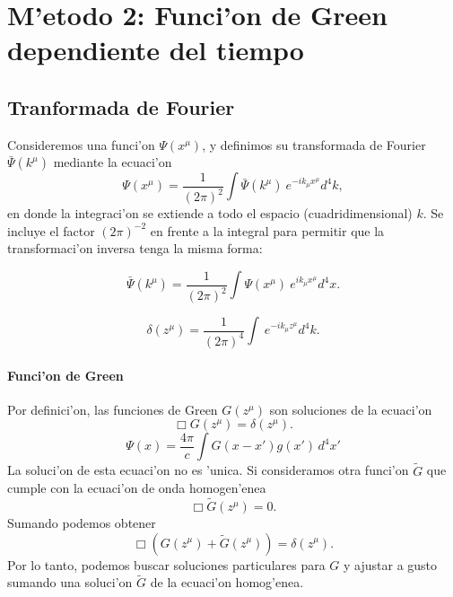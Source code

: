 \chapter{M'etodo 2: Funci'on de Green dependiente del tiempo}
\section{Tranformada de Fourier}

 Consideremos una funci'on $\Psi(x^\mu)  $,
 y definimos su transformada de Fourier $\bar{\Psi}(k^\mu)$ mediante
 la ecuaci'on%
 \begin{equation}
 \Psi(x^\mu)  =\frac{1}{(2\pi)^2}\int \bar\Psi(k^\mu)
 ~e^{-ik_\mu x^\mu }d^4k,
 \end{equation}
 en donde la integraci'on se extiende a todo el espacio
 (cuadridimensional) $k$. Se incluye el factor $(2\pi)
 ^{-2}$ en frente a la integral
 para permitir que la transformaci'on inversa tenga la misma forma:%

 \begin{equation}
 \bar{\Psi}(k^\mu)  =\frac{1}{(2\pi)^2}\int \Psi(x^\mu)
 ~e^{ik_\mu x^\mu }d^4x.
 \end{equation}

 \begin{equation}
 \delta(z^\mu) =\frac{1}{(2\pi)^4}\int~e^{-ik_\mu z^\mu }d^4k.
 \end{equation}

 \subsubsection{Funci'on de Green}

 Por definici'on, las funciones de Green $G(z^\mu)$ son soluciones de la ecuaci'on
 \begin{equation}
 \Box G(z^\mu)  =\delta(z^\mu)  .
 \end{equation}
 \begin{equation}
 \Psi (x)=\frac{4\pi}{c}\int G\left(x-x'\right) g(x')\,d^4x'
 \end{equation}
 La soluci'on de esta ecuaci'on no es 'unica. Si consideramos otra
 funci'on $\tilde{G}$ que cumple con la ecuaci'on de onda homogen'enea
 \begin{equation}
 \Box\tilde{G}(z^\mu)  =0.
 \end{equation}
 Sumando podemos obtener%
 \begin{equation}
 \Box\left(  G(z^\mu)  +\tilde{G}\left(
 z^\mu \right) \right)  =\delta(z^\mu)  .
 \end{equation}
 Por lo tanto, podemos buscar soluciones particulares para $G$ y
 ajustar a gusto sumando una soluci'on $\tilde{G}$ de la
 ecuaci'on homog'enea.

